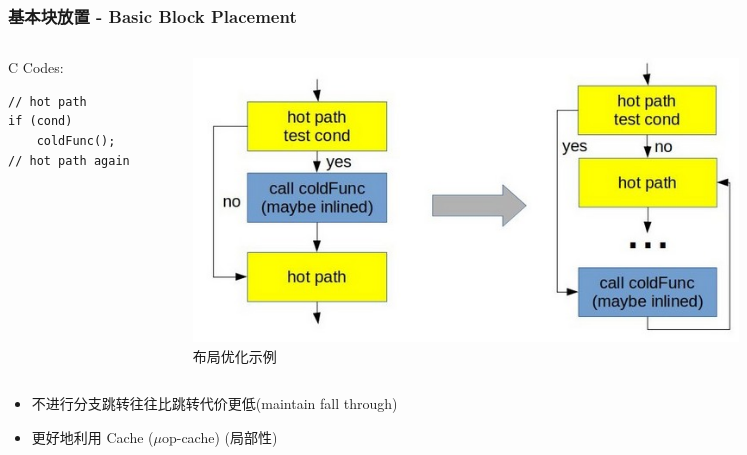\begin{frame}[fragile]
    \frametitle{基本块放置 - Basic Block Placement}

    \begin{columns}
        \begin{column}{0.3\textwidth}
            \centering
            C Codes:
            \begin{lstlisting}
// hot path
if (cond)
    coldFunc();
// hot path again\end{lstlisting}
        \end{column}
        \begin{column}{0.65\textwidth}
            \begin{figure}
                \centering
                \includegraphics[width=0.86\textwidth]{images/hot_cold_placement.jpg}
                \caption{布局优化示例}
            \end{figure}
        \end{column}
    \end{columns}
    \begin{itemize}
        \item 不进行分支跳转往往比跳转代价更低(maintain fall through)
        \item 更好地利用 Cache ($\mu$op-cache) (局部性)
    \end{itemize}

\end{frame}

